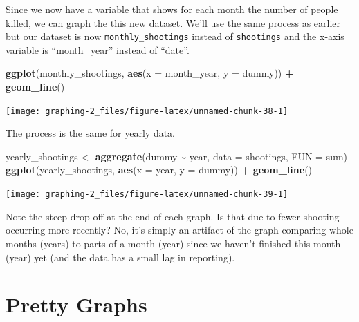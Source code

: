 \documentclass[
  12pt,
]{book}
\newenvironment{Shaded}{\begin{snugshade}}{\end{snugshade}}
\newcommand{\DataTypeTok}[1]{\textcolor[rgb]{0.13,0.29,0.53}{#1}}
\newcommand{\KeywordTok}[1]{\textcolor[rgb]{0.13,0.29,0.53}{\textbf{#1}}}
\newcommand{\NormalTok}[1]{#1}
\newcommand{\OperatorTok}[1]{\textcolor[rgb]{0.81,0.36,0.00}{\textbf{#1}}}
\newcommand{\StringTok}[1]{\textcolor[rgb]{0.31,0.60,0.02}{#1}}
\begin{document}
Since we now have a variable that shows for each month the number of people killed, we can graph the this new dataset. We'll use the same process as earlier but our dataset is now \texttt{monthly\_shootings} instead of \texttt{shootings} and the x-axis variable is ``month\_year'' instead of ``date''.

\begin{Shaded}
\begin{Highlighting}[]
\KeywordTok{ggplot}\NormalTok{(monthly\_shootings, }\KeywordTok{aes}\NormalTok{(}\DataTypeTok{x =}\NormalTok{ month\_year, }\DataTypeTok{y =}\NormalTok{ dummy)) }\OperatorTok{+}
\StringTok{  }\KeywordTok{geom\_line}\NormalTok{()}
\end{Highlighting}
\end{Shaded}

\begin{center}\texttt{[image: graphing-2\_files/figure-latex/unnamed-chunk-38-1]} \end{center}

The process is the same for yearly data.

\begin{Shaded}
\begin{Highlighting}[]
\NormalTok{yearly\_shootings <{-}}\StringTok{ }\KeywordTok{aggregate}\NormalTok{(dummy }\OperatorTok{\textasciitilde{}}\StringTok{ }\NormalTok{year, }\DataTypeTok{data =}\NormalTok{ shootings, }\DataTypeTok{FUN =}\NormalTok{ sum)}
\KeywordTok{ggplot}\NormalTok{(yearly\_shootings, }\KeywordTok{aes}\NormalTok{(}\DataTypeTok{x =}\NormalTok{ year, }\DataTypeTok{y =}\NormalTok{ dummy)) }\OperatorTok{+}
\StringTok{  }\KeywordTok{geom\_line}\NormalTok{()}
\end{Highlighting}
\end{Shaded}

\begin{center}\texttt{[image: graphing-2\_files/figure-latex/unnamed-chunk-39-1]} \end{center}

Note the steep drop-off at the end of each graph. Is that due to fewer shooting occurring more recently? No, it's simply an artifact of the graph comparing whole months (years) to parts of a month (year) since we haven't finished this month (year) yet (and the data has a small lag in reporting).

\hypertarget{pretty-graphs}{%
\section{Pretty Graphs}\label{pretty-graphs}}
\end{document}
